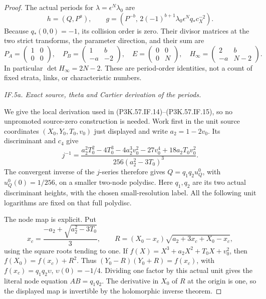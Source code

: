 \begin{proof}
The actual periods for \(\lambda=\epsilon^N\lambda_0\) are
\[
 h=(Q,P^a),\qquad
 g=(P^{-b},\,2(-1)^{b+1}\lambda_0\epsilon^N q_*c_X^{-2}).
                                                               \tag{P3K.57.IF.15}
\]
Because \(q_*(0,0)=-1\), its collision order is zero. Their divisor matrices
at the two strict transforms, the parameter direction, and their sum are
\[
 P_A=\begin{pmatrix}1&0\\0&0\end{pmatrix},\quad
 P_B=\begin{pmatrix}1&b\\-a&-2\end{pmatrix},\quad
 E=\begin{pmatrix}0&0\\0&N\end{pmatrix},\quad
 H_\infty=\begin{pmatrix}2&b\\-a&N-2\end{pmatrix}.
                                                               \tag{P3K.57.IF.16}
\]
In particular \(\det H_\infty=2N-2\). These are period-order identities,
not a count of fixed strata, links, or characteristic numbers.

\par\smallskip\noindent\textit{IF.5a. Exact source, theta and Cartier derivation of the periods.}\par\nopagebreak[4]

We give the local derivation used in (P3K.57.IF.14)--\allowbreak (P3K.57.IF.15), so no
unpromoted source-zero construction is needed. Work first in the
unit source coordinates \((X_0,Y_0,T_0,v_0)\) just displayed and
write \(a_2=1-2v_0\). Its discriminant and \(c_4\) give
\[
 j^{-1}=\frac{a_2^2T_0^2-4T_0^3-4a_2^3v_0^2-27v_0^4
                         +18a_2T_0v_0^2}
                   {256(a_2^2-3T_0)^3}.                 \tag{P3K.57.IF.16a}
\]
The convergent inverse of the \(j\)-series therefore gives
\(Q=q_1q_2u_Q^0\), with \(u_Q^0(0)=1/256\), on a
smaller two-node polydisc. Here \(q_1,q_2\) are its two
actual discriminant heights, with the chosen small-resolution
label. All the following unit logarithms are fixed on that
full polydisc.

The node map is explicit. Put
\[
 x_c=\frac{-a_2+\sqrt{a_2^2-3T_0}}3,\qquad
 R=(X_0-x_c)\sqrt{a_2+3x_c+X_0-x_c},
\]
using the square roots tending to one. If
\(f(X)=X^3+a_2X^2+T_0X+v_0^2\), then
\(f(X_0)=f(x_c)+R^2\). Thus
\((Y_0-R)(Y_0+R)=f(x_c)\), with
\(f(x_c)=q_1q_2\upsilon\), \(\upsilon(0)=-1/4\).
Dividing one factor by this actual unit gives the literal
node equation \(AB=q_1q_2\). The derivative in \(X_0\)
of \(R\) at the origin is one, so the displayed map is
invertible by the holomorphic inverse theorem.


\end{proof}
